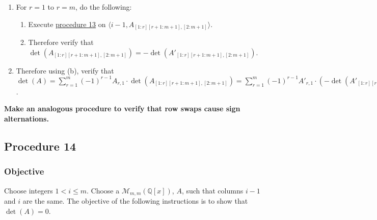 \documentclass[twocolumn]{article}
\begin{document}
\begin{enumerate}
\begin{enumerate}
						\item For $r=1$ to $r=m$, do the following:
						\begin{enumerate}
							\item Execute \hyperref[sec:procedure 13]{procedure 13} on $\langle i-1,\allowbreak A_{[1:r][r+1:m+1],[2:m+1]}\rangle$.
							\item Therefore verify that $\det(A_{[1:r][r+1:m+1],[2:m+1]})=-\det(A'_{[1:r][r+1:m+1],[2:m+1]})$.
						\end{enumerate}
						\item Therefore using (b), verify that $\det(A)=\sum_{r=1}^m (-1)^{r-1}A_{r,1}\cdot\det(A_{[1:r][r+1:m+1],[2:m+1]})=\sum_{r=1}^m (-1)^{r-1}A'_{r,1}\cdot(-\det(A'_{[1:r][r+1:m+1],[2:m+1]}))=-\det(A')$.
					\end{enumerate}
				\end{enumerate}
			\textbf{Make an analogous procedure to verify that row swaps cause sign alternations.}
		\subsection{Procedure 14}\label{sec:procedure 14}
			\subsubsection{Objective}
				Choose integers $1<i\le m$. Choose a $\mathcal{M}_{m,m}(\mathbb{Q}[x])$, $A$, such that columns $i-1$ and $i$ are the same. The objective of the following instructions is to show that $\det(A)=0$.
\end{document}
